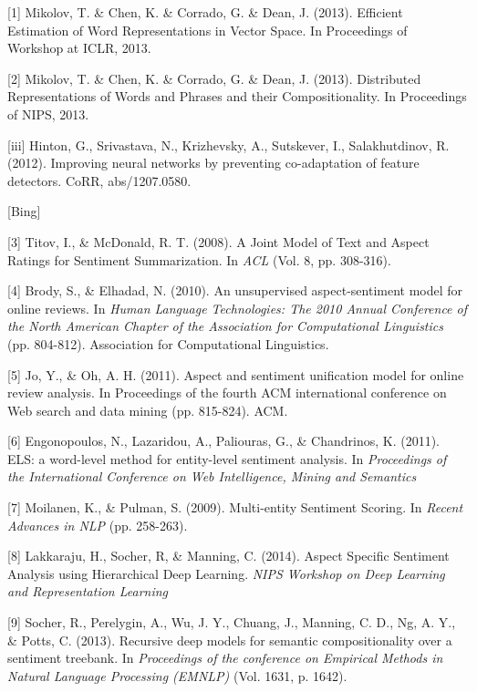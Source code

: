 \documentclass{article} %
\begin{document}
\small{

[1] Mikolov, T. \& Chen, K. \& Corrado, G. \& Dean, J. (2013). Efficient Estimation of Word Representations in Vector Space. In Proceedings of Workshop at ICLR, 2013.

[2] Mikolov, T. \& Chen, K. \& Corrado, G. \& Dean, J. (2013). Distributed Representations of Words and Phrases and their Compositionality. In Proceedings of NIPS, 2013.

[iii] Hinton, G., Srivastava, N., Krizhevsky, A., Sutskever, I., Salakhutdinov, R. (2012). Improving neural networks by preventing co-adaptation of feature detectors. CoRR, abs/1207.0580.

[Bing]

[3] Titov, I., \& McDonald, R. T. (2008). A Joint Model of Text and Aspect Ratings for Sentiment Summarization. In {\it ACL} (Vol. 8, pp. 308-316).

[4] Brody, S., \& Elhadad, N. (2010). An unsupervised aspect-sentiment model for online reviews. In {\it Human Language Technologies: The 2010 Annual Conference of the North American Chapter of the Association for Computational Linguistics} (pp. 804-812). Association for Computational Linguistics.

[5] Jo, Y., \& Oh, A. H. (2011). Aspect and sentiment unification model for online review analysis. In Proceedings of the fourth ACM international conference on Web search and data mining (pp. 815-824). ACM.


[6] Engonopoulos, N., Lazaridou, A., Paliouras, G., \& Chandrinos, K. (2011). ELS: a word-level method for entity-level sentiment analysis. In {\it Proceedings of the International Conference on Web Intelligence, Mining and Semantics}


[7] Moilanen, K., \& Pulman, S. (2009). Multi-entity Sentiment Scoring. In {\it Recent Advances in NLP} (pp. 258-263).


[8] Lakkaraju, H., Socher, R, \& Manning, C. (2014). Aspect Specific Sentiment Analysis using Hierarchical Deep Learning. {\it NIPS Workshop on Deep Learning and Representation Learning}

[9] Socher, R., Perelygin, A., Wu, J. Y., Chuang, J., Manning, C. D., Ng, A. Y., \& Potts, C. (2013). Recursive deep models for semantic compositionality over a sentiment treebank. In {\it Proceedings of the conference on Empirical Methods in Natural Language Processing (EMNLP)} (Vol. 1631, p. 1642).



}
\end{document}
